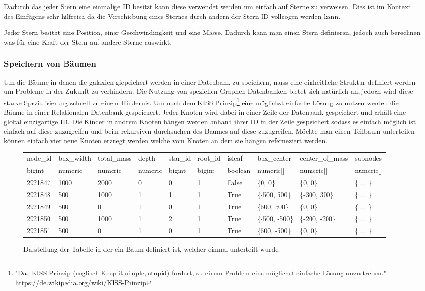Dadurch das jeder Stern eine einmalige ID besitzt kann diese verwendet werden
um einfach auf Sterne zu verweisen. Dies ist im Kontext des Einfügens sehr
hilfreich da die Verschiebung eines Sternes durch ändern der Stern-ID vollzogen
werden kann.

\par Jeder Stern besitzt eine Position, einer Geschwindingkeit und eine Masse.
Dadurch kann man einen Stern definieren, jedoch auch berechnen was für eine
Kraft der Stern auf andere Sterne auswirkt. 

\subsubsection{Speichern von Bäumen}
Um die Bäume in denen die galaxien giepeichert werden in einer Datenbank zu
speichern, muss eine einheitliche Struktur definiert werden um Probleme in der
Zukunft zu verhindern. Die Nutzung von speziellen Graphen Datenbanken bietet
sich natürlich an, jedoch wird diese starke Spezialisierung schnell zu einem
Hindernis. Um nach dem KISS Prinzip\footnote{"Das KISS-Prinzip (englisch Keep
it simple, stupid) fordert, zu einem Problem eine möglichst einfache Lösung
anzustreben." \url{https://de.wikipedia.org/wiki/KISS-Prinzip}} eine möglichst
einfache Lösung zu nutzen werden die Bäume in einer Relationalen Datenbank
gespeichert. Jeder Knoten wird dabei in einer Zeile der Datenbank gespeichert
und erhält eine global einzigartige ID. Die Kinder in andrem Knoten hängen
werden anhand ihrer ID in der Zeile gespeichert sodass es einfach möglich ist
einfach auf diese zuzugreifen und beim rekursiven durchsuchen des Baumes auf
diese zuzugreifen. Möchte man einen Teilbaum unterteilen können einfach vier
neue Knoten erzuegt werden welche vom Knoten an dem sie hängen referneziert
werden.

\begin{figure*}[ht]
\begin{tabular} {l | l | l | l | l | l | l | l | l | l}
node\_id & box\_width & total\_mass & depth & star\_id & root\_id & isleaf & box\_center & center\_of\_mass & subnodes  \\ 
bigint & numeric & numeric & numeric & bigint & bigint & boolean & numeric[] & numeric[] & numeric[]  \\ \hline\hline
2921847 & 1000 & 2000 & 0 & 0 & 1 & False & \{0, 0\}       & \{0, 0\}       & \{ \(\dots\) \}  \\ \hline
2921848 & 500  & 1000 & 1 & 1 & 1 & True  & \{-500, 500\}  & \{-300, 300\}  & \{ \(\dots\) \}  \\ \hline
2921849 & 500  & 0    & 1 & 0 & 1 & True  & \{500, 500\}   & \{0, 0\}       & \{ \(\dots\) \}  \\ \hline
2921850 & 500  & 1000 & 1 & 2 & 1 & True  & \{-500, -500\} & \{-200, -200\} & \{ \(\dots\) \}  \\ \hline
2921851 & 500  & 0    & 1 & 0 & 1 & True  & \{500, -500\}  & \{0, 0\}       & \{ \(\dots\) \}  \\ \hline
\end{tabular}
\caption{Darstellung der Tabelle in der ein Baum definiert ist, welcher einmal unterteilt wurde.}
\end{figure*}


